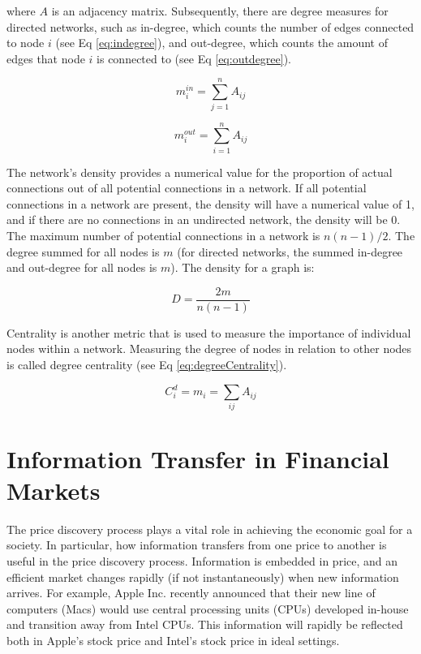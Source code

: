  \noindent where \(A\) is an adjacency matrix. Subsequently, there are degree measures for directed networks, such as in-degree, which counts the number of edges connected to node \(i\) (see Eq \ref{eq:indegree}), and out-degree, which counts the amount of edges that node \(i\) is connected to (see Eq \ref{eq:outdegree}).

\begin{equation}
    \label{eq:indegree}
    m_i^{in} =  \sum_{j=1}^{n}A_{ij}
\end{equation}

\begin{equation}
    \label{eq:outdegree}
    m_i^{out} =  \sum_{i=1}^{n}A_{ij}
\end{equation}

\noindent The network's density provides a numerical value for the proportion of actual connections out of all potential connections in a network. If all potential connections in a network are present,  the density will have a numerical value of 1, and if there are no connections in an undirected network, the density will be 0. The maximum number of potential connections in a network is \(n(n-1)/2\).  The degree summed for all nodes is \(m\) (for directed networks, the summed in-degree and out-degree for all nodes is \(m\)). The density for a graph is:

\begin{equation}
    \label{eq:density}
    D = \frac{2m}{n (n-1)}
\end{equation}

Centrality is another metric that is used to measure the importance of individual nodes within a network. Measuring the degree of nodes in relation to other nodes is called degree centrality (see Eq \ref{eq:degreeCentrality}). 

\begin{equation}
    \label{eq:degreeCentrality}
    C_i^d =  m_i = \sum_{ij}A_{ij}
\end{equation}


\section{Information Transfer in Financial Markets} \label{IFinFM}

The price discovery process plays a vital role in achieving the economic goal for a society.   In particular, how information transfers from one price to another is useful in the price discovery process.  Information is embedded in price, and an efficient market changes rapidly (if not instantaneously) when new information arrives.  For example, Apple Inc. recently announced that their new line of computers (Macs) would use central processing units (CPUs) developed in-house and transition away from Intel CPUs.  This information will rapidly be reflected both in Apple's stock price and Intel's stock price in ideal settings.

